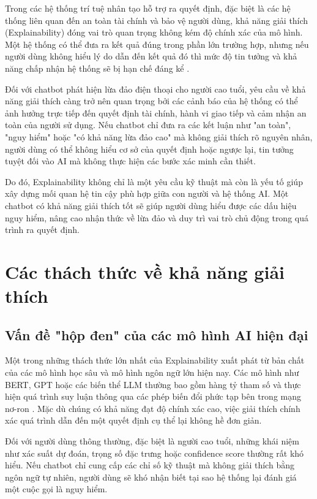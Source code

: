 Trong các hệ thống trí tuệ nhân tạo hỗ trợ ra quyết định, đặc biệt là các hệ thống liên quan đến an toàn tài chính và bảo vệ người dùng, khả năng giải thích (Explainability) đóng vai trò quan trọng không kém độ chính xác của mô hình. Một hệ thống có thể đưa ra kết quả đúng trong phần lớn trường hợp, nhưng nếu người dùng không hiểu lý do dẫn đến kết quả đó thì mức độ tin tưởng và khả năng chấp nhận hệ thống sẽ bị hạn chế đáng kể \cite{shin2021_explainability_trust}.

Đối với chatbot phát hiện lừa đảo điện thoại cho người cao tuổi, yêu cầu về khả năng giải thích càng trở nên quan trọng bởi các cảnh báo của hệ thống có thể ảnh hưởng trực tiếp đến quyết định tài chính, hành vi giao tiếp và cảm nhận an toàn của người sử dụng. Nếu chatbot chỉ đưa ra các kết luận như "an toàn", "nguy hiểm" hoặc "có khả năng lừa đảo cao" mà không giải thích rõ nguyên nhân, người dùng có thể không hiểu cơ sở của quyết định hoặc ngược lại, tin tưởng tuyệt đối vào AI mà không thực hiện các bước xác minh cần thiết.

Do đó, Explainability không chỉ là một yêu cầu kỹ thuật mà còn là yếu tố giúp xây dựng mối quan hệ tin cậy phù hợp giữa con người và hệ thống AI. Một chatbot có khả năng giải thích tốt sẽ giúp người dùng hiểu được các dấu hiệu nguy hiểm, nâng cao nhận thức về lừa đảo và duy trì vai trò chủ động trong quá trình ra quyết định.

\section{Các thách thức về khả năng giải thích}
\subsection{Vấn đề "hộp đen" của các mô hình AI hiện đại}
Một trong những thách thức lớn nhất của Explainability xuất phát từ bản chất của các mô hình học sâu và mô hình ngôn ngữ lớn hiện nay. Các mô hình như BERT, GPT hoặc các biến thể LLM thường bao gồm hàng tỷ tham số và thực hiện quá trình suy luận thông qua các phép biến đổi phức tạp bên trong mạng nơ-ron \cite{devlin2018bert, shoeybi2019megatron}. Mặc dù chúng có khả năng đạt độ chính xác cao, việc giải thích chính xác quá trình dẫn đến một quyết định cụ thể lại không hề đơn giản.

Đối với người dùng thông thường, đặc biệt là người cao tuổi, những khái niệm như xác suất dự đoán, trọng số đặc trưng hoặc confidence score thường rất khó hiểu. Nếu chatbot chỉ cung cấp các chỉ số kỹ thuật mà không giải thích bằng ngôn ngữ tự nhiên, người dùng sẽ khó nhận biết tại sao hệ thống lại đánh giá một cuộc gọi là nguy hiểm.


